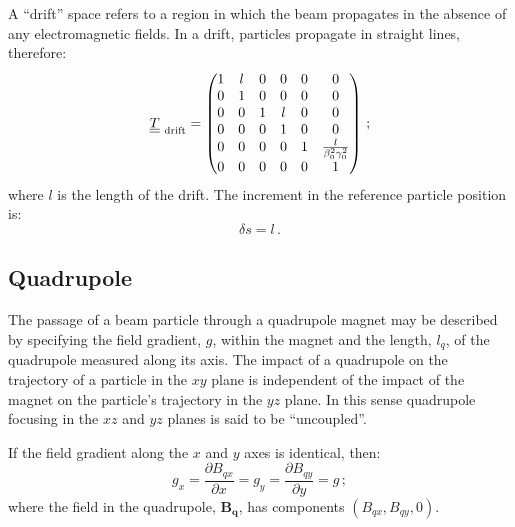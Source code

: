 A ``drift'' space refers to a region in which the beam propagates in
the absence of any electromagnetic fields.
In a drift, particles propagate in straight lines, therefore:
\begin{equation}
  \underline{\underline{T}}_{\rm~drift} =
        \begin{pmatrix}
          1 & l & 0 & 0 & 0 &                             0 \\
          0 & 1 & 0 & 0 & 0 &                             0 \\
          0 & 0 & 1 & l & 0 &                             0 \\
          0 & 0 & 0 & 1 & 0 &                             0 \\
          0 & 0 & 0 & 0 & 1 & \frac{l}{\beta_0^2 \gamma_0^2} \\
          0 & 0 & 0 & 0 & 0 &                             1
        \end{pmatrix} \, ; 
\end{equation}
where $l$ is the length of the drift.
The increment in the reference particle position is:
\begin{equation}
  \delta s = l \, .
\end{equation}

\subsection{Quadrupole}

The passage of a beam particle through a quadrupole magnet may be
described by specifying the field gradient, $g$, within the magnet and
the length, $l_q$, of the quadrupole measured along its axis.
The impact of a quadrupole on the trajectory of a particle in the $xy$
plane is independent of the impact of the magnet on the particle's
trajectory in the $yz$ plane.   
In this sense quadrupole focusing in the $xz$ and $yz$ planes is said
to be ``uncoupled''. 

If the field gradient along the $x$ and $y$ axes is identical, then:
\begin{equation}
  g_x = \frac{\partial B_{qx}}{\partial x} =
  g_y = \frac{\partial B_{qy}}{\partial y} = g \, ; \label{Eq:Trnsf:gxy}
\end{equation}
where the field in the quadrupole, $\bm{B_q}$, has components
$(B_{qx}, B_{qy}, 0)$.

